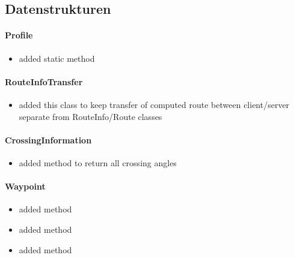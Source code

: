 \subsection{Datenstrukturen}

\paragraph{Profile}
\begin{itemize}
	\item added static method 
\end{itemize}

\paragraph{RouteInfoTransfer}
\begin{itemize}
	\item added this class to keep transfer of computed route between client/server separate from RouteInfo/Route classes
\end{itemize}

\paragraph{CrossingInformation}
\begin{itemize}
	\item added method  to return all crossing angles
\end{itemize}

\paragraph{Waypoint}
\begin{itemize}
	\item added method 
	\item added method 
	\item added method 
\end{itemize}